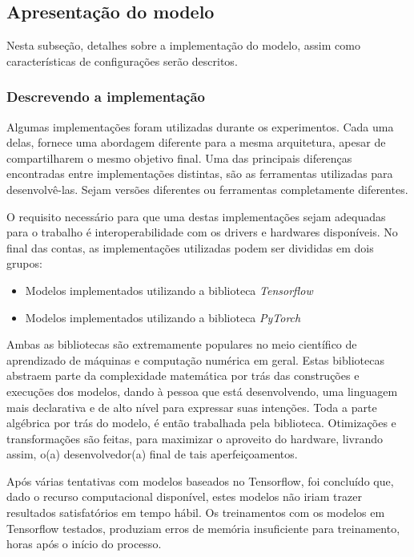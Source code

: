 \subsection{Apresentação do modelo}

Nesta subseção, detalhes sobre a implementação do modelo, assim como características de configurações serão descritos.

\subsubsection{Descrevendo a implementação}

Algumas implementações foram utilizadas durante os experimentos. Cada uma delas, fornece uma abordagem diferente para a mesma arquitetura, apesar de compartilharem o mesmo objetivo final. Uma das principais diferenças encontradas entre implementações distintas, são as ferramentas utilizadas para desenvolvê-las. Sejam versões diferentes ou ferramentas completamente diferentes.

O requisito necessário para que uma destas implementações sejam adequadas para o trabalho é interoperabilidade com os drivers e hardwares disponíveis. No final das contas, as implementações utilizadas podem ser divididas em dois grupos:

\begin{itemize}
    \item Modelos implementados utilizando a biblioteca \textit{Tensorflow}
    \item Modelos implementados utilizando a biblioteca \textit{PyTorch}
\end{itemize}

Ambas as bibliotecas são extremamente populares no meio científico de aprendizado de máquinas e computação numérica em geral. Estas bibliotecas abstraem parte da complexidade matemática por trás das construções e execuções dos modelos, dando à pessoa que está desenvolvendo, uma linguagem mais declarativa e de alto nível para expressar suas intenções. Toda a parte algébrica por trás do modelo, é então trabalhada pela biblioteca. Otimizações e transformações são feitas, para maximizar o aproveito do hardware, livrando assim, o(a) desenvolvedor(a) final de tais aperfeiçoamentos.

Após várias tentativas com modelos baseados no Tensorflow, foi concluído que, dado o recurso computacional disponível, estes modelos não iriam trazer resultados satisfatórios em tempo hábil. Os treinamentos com os modelos em Tensorflow testados, produziam erros de memória insuficiente para treinamento, horas após o início do processo.

